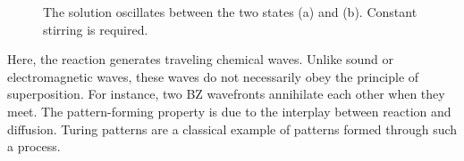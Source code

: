 \documentclass[twocolumn,amsmath,amssymb,aps]{revtex4}
\begin{document}
\begin{figure}
	\centering
	\vspace{+15pt}
	\caption{The solution oscillates between the two states (a) and (b). Constant stirring is required.}
	\label{fig:Pattern}
\end{figure}


Here, the reaction generates traveling chemical waves. Unlike sound or electromagnetic waves, these waves do not necessarily obey the principle of superposition. For instance, two BZ wavefronts annihilate each other when they meet. The pattern-forming property is due to the interplay between reaction and diffusion. Turing patterns are a classical example of patterns formed through such a process. 
\end{document}
